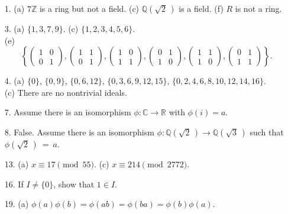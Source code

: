 {\small
\begin{itemize}
 
\item[1.]
(a) $7 {\mathbb Z}$ is a ring but not a field.
(c) ${\mathbb Q}(\sqrt{2}\, )$ is a field.
(f) $R$ is not a ring.
 
 
\item[3.]
(a) $\{1, 3, 7, 9 \}$.
(c) $\{ 1, 2, 3, 4, 5, 6 \}$. \\
(e) 
\[
\left\{
\begin{pmatrix}
1 & 0 \\
0 & 1
\end{pmatrix},
\begin{pmatrix}
1 & 1 \\
0 & 1
\end{pmatrix},
\begin{pmatrix}
1 & 0 \\
1 & 1
\end{pmatrix},
\begin{pmatrix}
0 & 1 \\
1 & 0
\end{pmatrix},
\begin{pmatrix}
1 & 1 \\
1 & 0
\end{pmatrix},
\begin{pmatrix}
0 & 1 \\
1 & 1
\end{pmatrix}
\right\}.
\]
 
 
\item[4.]
(a) $\{0 \}$, $\{0, 9 \}$, $\{0, 6, 12 \}$,
 $\{0, 3, 6, 9, 12, 15 \}$,  $\{0, 2, 4, 6, 8, 10, 12, 14, 16 \}$. \\
(c) There are no nontrivial ideals.
 
 
 
\item[7.]
Assume there is an isomorphism $\phi: {\mathbb C} \rightarrow {\mathbb R}$
with $\phi(i) = a$.
 
\item[8.]
False. Assume there is an isomorphism $\phi: {\mathbb Q}(\sqrt{2}\, )
\rightarrow {\mathbb Q}(\sqrt{3}\, )$ such that $\phi(\sqrt{2}\, )~=~a$.
 
\item[13.]
(a) $x \equiv 17 \pmod{55}$. (c) $x \equiv 214 \pmod{2772}$.
 
 
\item[16.]
If $I \neq \{ 0 \}$, show that $1 \in I$.
 
\item[19.]
(a) $\phi(a) \phi(b) = \phi(ab) = \phi(ba) = \phi(b) \phi(a)$.
 

\end{itemize}}
